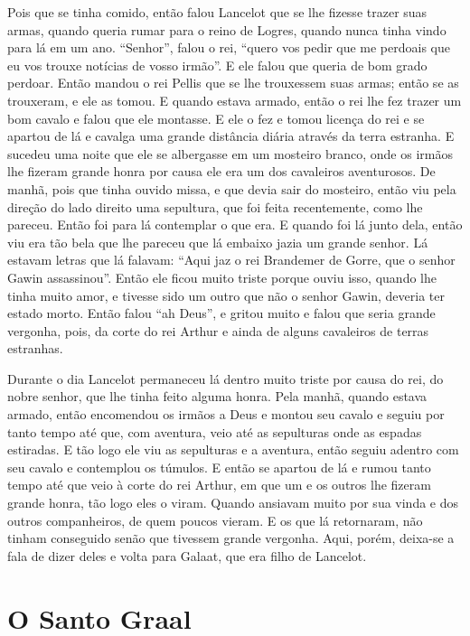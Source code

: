 Pois que se tinha comido, então falou Lancelot que se lhe fizesse trazer suas
armas, quando queria rumar para o reino de Logres, quando nunca tinha vindo
para lá em um ano. “Senhor”, falou o rei, “quero vos pedir que me perdoais que
eu vos trouxe notícias de vosso irmão”. E ele falou que queria de bom grado
perdoar. Então mandou o rei Pellis que se lhe trouxessem suas armas; então se
as trouxeram, e ele as tomou. E quando estava armado, então o rei lhe fez
trazer um bom cavalo e falou que ele montasse. E ele o fez e tomou licença do
rei e se apartou de lá e cavalga uma grande distância diária através da terra
estranha. E sucedeu uma noite que ele se albergasse em um mosteiro branco, onde
os irmãos lhe fizeram grande honra por causa ele era um dos cavaleiros
aventurosos. De manhã, pois que tinha ouvido missa, e que devia sair
do mosteiro, então viu pela direção do lado direito uma sepultura, que foi
feita recentemente, como lhe pareceu. Então foi para lá contemplar o que era. E
quando foi lá junto dela, então viu era tão bela que lhe pareceu que lá embaixo
jazia um grande senhor. Lá estavam letras que lá falavam: “Aqui jaz o
rei Brandemer de Gorre, que o senhor Gawin assassinou”. Então ele ficou muito
triste porque ouviu isso, quando lhe tinha muito amor, e tivesse sido um outro
que não o senhor Gawin, deveria ter estado morto. Então falou “ah Deus”, e
gritou muito e falou que seria grande vergonha, pois, da corte do rei Arthur e
ainda de alguns cavaleiros de terras estranhas.

 Durante o dia Lancelot permaneceu lá dentro muito triste por causa do rei, do
nobre senhor, que lhe tinha feito alguma honra. Pela manhã, quando
estava armado, então encomendou os irmãos a Deus e montou seu cavalo e seguiu
por tanto tempo até que, com aventura, veio até as sepulturas onde as espadas
estiradas. E tão logo ele viu as sepulturas e a aventura, então seguiu adentro
com seu cavalo e contemplou os túmulos. E então se apartou de lá e rumou tanto
tempo até que veio à corte do rei Arthur, em que um e os outros lhe fizeram
grande honra, tão logo eles o viram. Quando ansiavam muito por sua vinda e dos
outros companheiros, de quem poucos vieram. E os que lá retornaram, não tinham
conseguido senão que tivessem grande vergonha. Aqui, porém, deixa-se a
fala de dizer deles e volta para Galaat, que era filho de Lancelot. 

\chapter{O Santo Graal}


